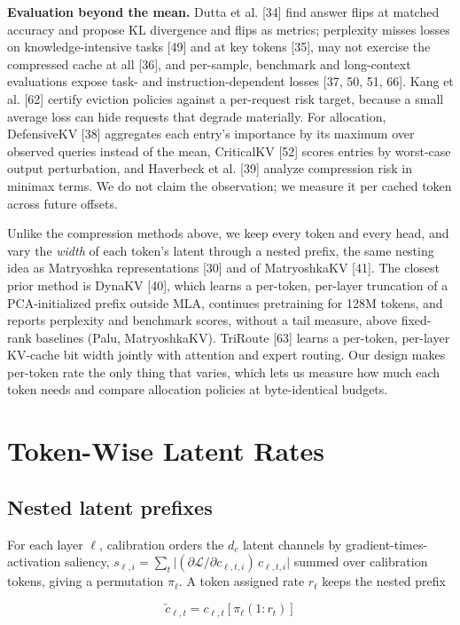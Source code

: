 \documentclass[11pt]{article}
\begin{document}
\textbf{Evaluation beyond the mean.} Dutta et al. [34] find answer flips at matched accuracy and propose KL divergence and flips as metrics; perplexity misses losses on knowledge-intensive tasks [49] and at key tokens [35], may not exercise the compressed cache at all [36], and per-sample, benchmark and long-context evaluations expose task- and instruction-dependent losses [37, 50, 51, 66]. Kang et al. [62] certify eviction policies against a per-request risk target, because a small average loss can hide requests that degrade materially. For allocation, DefensiveKV [38] aggregates each entry's importance by its maximum over observed queries instead of the mean, CriticalKV [52] scores entries by worst-case output perturbation, and Haverbeck et al. [39] analyze compression risk in minimax terms. We do not claim the observation; we measure it per cached token across future offsets.

Unlike the compression methods above, we keep every token and every head, and vary the \textit{width} of each token's latent through a nested prefix, the same nesting idea as Matryoshka representations [30] and of MatryoshkaKV [41]. The closest prior method is DynaKV [40], which learns a per-token, per-layer truncation of a PCA-initialized prefix outside MLA, continues pretraining for 128M tokens, and reports perplexity and benchmark scores, without a tail measure, above fixed-rank baselines (Palu, MatryoshkaKV). TriRoute [63] learns a per-token, per-layer KV-cache bit width jointly with attention and expert routing. Our design makes per-token rate the only thing that varies, which lets us measure how much each token needs and compare allocation policies at byte-identical budgets.

\section{Token-Wise Latent Rates}

\subsection{Nested latent prefixes}

For each layer $\ell$, calibration orders the $d_c$ latent channels by gradient-times-activation saliency, $s_{\ell,i}=\sum_t\lvert(\partial\mathcal L/\partial c_{\ell,t,i})\,c_{\ell,t,i}\rvert$ summed over calibration tokens, giving a permutation $\pi_\ell$. A token assigned rate $r_t$ keeps the nested prefix

\[\tilde c_{\ell,t}=c_{\ell,t}[\pi_\ell(1:r_t)]\]
\end{document}

